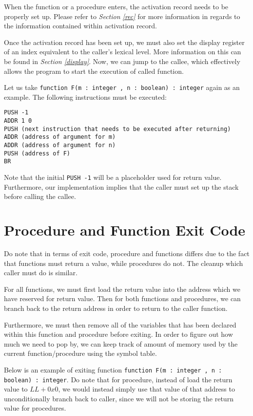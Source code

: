 \documentclass{article}
\begin{document}
When the function or a procedure enters, the activation record needs to be properly set up. Please refer to {\it Section \ref{rec}} for more information in regards to the information contained within activation record.

Once the activation record has been set up, we must also set the display register of an index equivalent to the caller's lexical level. More information on this can be found in {\it Section \ref{display}}. Now, we can jump to the callee, which effectively allows the program to start the execution of called function.

Let us take {\tt function F(m : integer , n : boolean) : integer} again as an example. The following instructions must be executed:

\begin{lstlisting}
PUSH -1
ADDR 1 0
PUSH (next instruction that needs to be executed after returning)
ADDR (address of argument for m)
ADDR (address of argument for n)
PUSH (address of F)
BR
\end{lstlisting}

Note that the initial {\tt PUSH -1} will be a placeholder used for return value. Furthermore, our implementation implies that the caller must set up the stack before calling the callee.

\section{Procedure and Function Exit Code} \label{exit}

Do note that in terms of exit code, procedure and functions differs due to the fact that functions must return a value, while procedures do not. The cleanup which caller must do is similar.

For all functions, we must first load the return value into the address which we have reserved for return value. Then for both functions and procedures, we can branch back to the return address in order to return to the caller function.

Furthermore, we must then remove all of the variables that has been declared within this function and procedure before exiting. In order to figure out how much we need to pop by, we can keep track of amount of memory used by the current function/procedure using the symbol table.

Below is an example of exiting function {\tt function F(m : integer , n : boolean) : integer}. Do note that for procedure, instead of load the return value to $LL + 0x0$, we would instead simply use that value of that address to unconditionally branch back to caller, since we will not be storing the return value for procedures.
\end{document}
